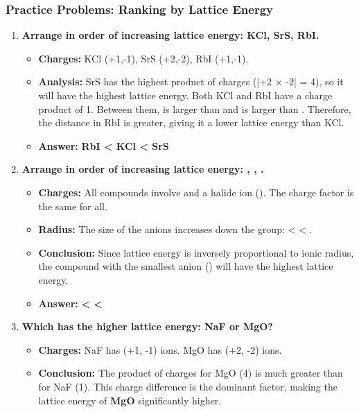 \documentclass{article}
\begin{document}
\subsubsection*{Practice Problems: Ranking by Lattice Energy}
\begin{enumerate}[itemsep=5pt]
    \item \textbf{Arrange in order of increasing lattice energy: KCl, SrS, RbI.}
    \begin{itemize}
        \item \textbf{Charges:} KCl (+1,-1), SrS (+2,-2), RbI (+1,-1).
        \item \textbf{Analysis:} SrS has the highest product of charges (|+2 \(\times\) -2| = 4), so it will have the highest lattice energy. Both KCl and RbI have a charge product of 1. Between them,  is larger than  and  is larger than . Therefore, the distance in RbI is greater, giving it a lower lattice energy than KCl.
        \item \textbf{Answer:} \textbf{RbI < KCl < SrS}
    \end{itemize}
    \item \textbf{Arrange in order of increasing lattice energy: , , .}
    \begin{itemize}
        \item \textbf{Charges:} All compounds involve  and a halide ion (). The charge factor is the same for all.
        \item \textbf{Radius:} The size of the anions increases down the group:  <  < .
        \item \textbf{Conclusion:} Since lattice energy is inversely proportional to ionic radius, the compound with the smallest anion () will have the highest lattice energy.
        \item \textbf{Answer:} \textbf{ <  < }
    \end{itemize}
    \item \textbf{Which has the higher lattice energy: NaF or MgO?}
    \begin{itemize}
        \item \textbf{Charges:} NaF has (+1, -1) ions. MgO has (+2, -2) ions.
        \item \textbf{Conclusion:} The product of charges for MgO (4) is much greater than for NaF (1). This charge difference is the dominant factor, making the lattice energy of \textbf{MgO} significantly higher.

\end{itemize}
\end{enumerate}
\end{document}
